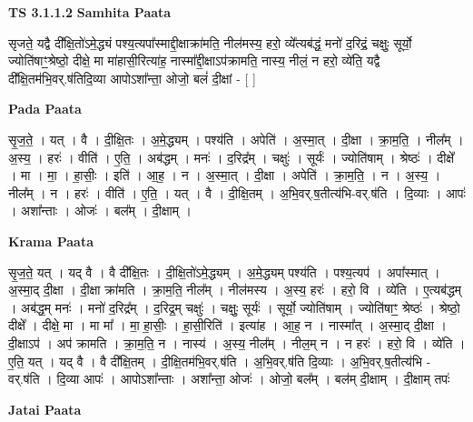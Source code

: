 \documentclass[17pt]{extarticle}
\begin{document}
\textbf{TS 3.1.1.2 } \newline
\textbf{Samhita Paata} \newline

सृजते॒ यद्वै दी᳚क्षि॒तो॑ऽमे॒द्ध्यं पश्य॒त्यपा᳚स्माद्दी॒क्षाक्रा॑मति॒ नील॑मस्य॒ हरो॒ व्ये᳚त्यब॑द्धं॒ मनो॑ द॒रिद्रं॒ चक्षुः॒ सूर्यो॒ ज्योति॑षाꣳ॒॒श्रेष्ठो॒ दीक्षे॒ मा मा॑हासी॒रित्या॑ह॒ नास्मा᳚द्दी॒क्षाऽप॑क्रामति॒ नास्य॒ नीलं॒ न हरो॒ व्ये॑ति॒ यद्वै दी᳚क्षि॒तम॑भि॒वर्.ष॑तिदि॒व्या आपोऽशा᳚न्ता॒ ओजो॒ बलं॑ दी॒क्षां - [  ] \newline

\textbf{Pada Paata} \newline

सृ॒ज॒ते॒ । यत् । वै । दी॒क्षि॒तः । अ॒मे॒द्ध्यम् । पश्य॑ति । अपेति॑ । अ॒स्मा॒त् । दी॒क्षा । क्रा॒म॒ति॒ । नील᳚म् । अ॒स्य॒ । हरः॑ । वीति॑ । ए॒ति॒ । अब॑द्धम् । मनः॑ । द॒रिद्र᳚म् । चक्षुः॑ । सूर्यः॑ । ज्योति॑षाम् । श्रेष्ठः॑ । दीक्षे᳚ । मा । मा॒ । हा॒सीः॒ । इति॑ । आ॒ह॒ । न । अ॒स्मा॒त् । दी॒क्षा । अपेति॑ । क्रा॒म॒ति॒ । न । अ॒स्य॒ । नील᳚म् । न । हरः॑ । वीति॑ । ए॒ति॒ । यत् । वै । दी॒क्षि॒तम् । अ॒भि॒वर्.ष॒तीत्य॑भि-वर्.ष॑ति । दि॒व्याः । आपः॑ । अशा᳚न्ताः । ओजः॑ । बल᳚म् । दी॒क्षाम् ।  \newline


\textbf{Krama Paata} \newline

सृ॒ज॒ते॒ यत् । यद् वै । वै दी᳚क्षि॒तः । दी॒क्षि॒तो॑ऽमे॒द्ध्यम् । अ॒मे॒द्ध्यम् पश्य॑ति । पश्य॒त्यप॑ । अपा᳚स्मात् । अ॒स्मा॒द् दी॒क्षा । दी॒क्षा क्रा॑मति । क्रा॒म॒ति॒ नील᳚म् । नील॑मस्य । अ॒स्य॒ हरः॑ । हरो॒ वि । व्ये॑ति । ए॒त्यब॑द्धम् । अब॑द्ध॒म् मनः॑ । मनो॑ द॒रिद्र᳚म् । द॒रिद्र॒म् चक्षुः॑ । चक्षुः॒ सूर्यः॑ । सूर्यो॒ ज्योति॑षाम् । ज्योति॑षाꣳ॒॒ श्रेष्ठः॑ । श्रेष्ठो॒ दीक्षे᳚ । दीक्षे॒ मा । मा मा᳚ । मा॒ हा॒सीः॒ । हा॒सी॒रिति॑ । इत्या॑ह । आ॒ह॒ न । नास्मा᳚त् । अ॒स्मा॒द् दी॒क्षा । दी॒क्षाऽप॑ । अप॑ क्रामति । क्रा॒म॒ति॒ न । नास्य॑ । अ॒स्य॒ नील᳚म् । नील॒म् न । न हरः॑ । हरो॒ वि । व्ये॑ति । ए॒ति॒ यत् । यद् वै । वै दी᳚क्षि॒तम् । दी॒क्षि॒तम॑भि॒वर्.ष॑ति । अ॒भि॒वर्.ष॑ति दि॒व्याः । अ॒भि॒वर्.ष॒तीत्य॑भि - वर्.ष॑ति । दि॒व्या आपः॑ । आपोऽशा᳚न्ताः । अशा᳚न्ता॒ ओजः॑ । ओजो॒ बल᳚म् । बल॑म् दी॒क्षाम् । दी॒क्षाम् तपः॑ \newline

\textbf{Jatai Paata} \newline
\end{document}
